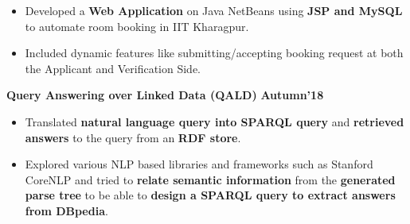 \documentclass[10pt]{article}
\begin{document}
\begin{itemize}
    \item Developed a \textbf{Web Application} on Java NetBeans using \textbf{JSP and MySQL} to automate room booking in IIT Kharagpur.\\[-1.9em]
    \item Included dynamic features like submitting/accepting booking request at both the Applicant and Verification Side.\\[-1em]
\end{itemize}
\vspace{-0.5ex}
\large {\textbf{Query Answering over Linked Data (QALD)}} \normalsize \href{https://github.com/shmundhra/QALD}{\hspace{0.5ex}\faGithub} {\hfill} \textbf{Autumn'18}\\[-1.75em]
\begin{itemize}
    \item Translated \textbf{natural language query into SPARQL query} and \textbf{retrieved answers} to the query from an \textbf{RDF store}.\\[-1.9em]
    \item Explored various NLP based libraries and frameworks such as Stanford CoreNLP and tried to \textbf{relate semantic information} from the \textbf{generated parse tree} to be able to \textbf{design a SPARQL query to extract answers from DBpedia}.\\[-1em]
\end{itemize}
\end{document}
